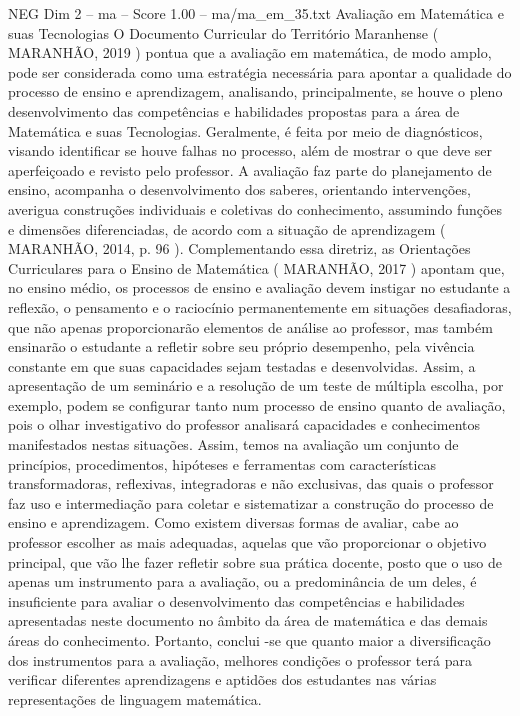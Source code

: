 \begin{textsample}{NEG Dim 2 – ma – Score 1.00 – ma/ma\_em\_35.txt}  \label{ex:f2_neg_240}
Avaliação em Matemática e suas Tecnologias O Documento Curricular do Território Maranhense ( MARANHÃO, 2019 ) pontua que a avaliação em matemática, de modo amplo, pode ser considerada como uma estratégia necessária para apontar a qualidade do processo de ensino e aprendizagem, analisando, principalmente, se houve o pleno desenvolvimento das competências e habilidades propostas para a área de Matemática e suas Tecnologias.
Geralmente, é feita por meio de diagnósticos, visando identificar se houve falhas no processo, além de mostrar o que deve ser aperfeiçoado e revisto pelo professor.
A avaliação faz parte do planejamento de ensino, acompanha o desenvolvimento dos saberes, orientando intervenções, averigua construções individuais e coletivas do conhecimento, assumindo funções e dimensões diferenciadas, de acordo com a situação de aprendizagem ( MARANHÃO, 2014, p. 96 ).
Complementando essa diretriz, as Orientações Curriculares para o Ensino de Matemática ( MARANHÃO, 2017 ) apontam que, no ensino médio, os processos de ensino e avaliação devem instigar no estudante a reflexão, o pensamento e o raciocínio permanentemente em situações desafiadoras, que não apenas proporcionarão elementos de análise ao professor, mas também ensinarão o estudante a refletir sobre seu próprio desempenho, pela vivência constante em que suas capacidades sejam testadas e desenvolvidas.
Assim, a apresentação de um seminário e a resolução de um teste de múltipla escolha, por exemplo, podem se configurar tanto num processo de ensino quanto de avaliação, pois o olhar investigativo do professor analisará capacidades e conhecimentos manifestados nestas situações.
Assim, temos na avaliação um conjunto de princípios, procedimentos, hipóteses e ferramentas com características transformadoras, reflexivas, integradoras e não exclusivas, das quais o professor faz uso e intermediação para coletar e sistematizar a construção do processo de ensino e aprendizagem.
Como existem diversas formas de avaliar, cabe ao professor escolher as mais adequadas, aquelas que vão proporcionar o objetivo principal, que vão lhe fazer refletir sobre sua prática docente, posto que o uso de apenas um instrumento para a avaliação, ou a predominância de um deles, é insuficiente para avaliar o desenvolvimento das competências e habilidades apresentadas neste documento no âmbito da área de matemática e das demais áreas do conhecimento.
Portanto, conclui -se que quanto maior a diversificação dos instrumentos para a avaliação, melhores condições o professor terá para verificar diferentes aprendizagens e aptidões dos estudantes nas várias representações de linguagem matemática.

\end{textsample}
